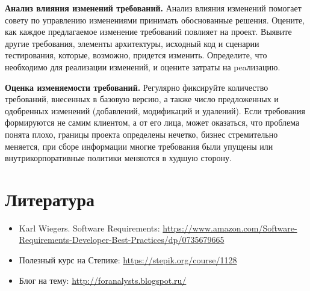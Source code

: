 \documentclass{../../text-style}
\begin{document}
\textbf{Анализ влияния изменений требований.}
 Анализ влияния изменений помогает совету по управлению изменениями принимать обоснованные решения.
 Оцените, как каждое предлагаемое изменение требований повлияет на проект.
 Выявите другие требования, элементы архитектуры, исходный код и сценарии тестирования, которые, возможно, придется изменить.
 Определите, что необходимо для реализации изменений, и оцените затраты на peaлизацию.

\textbf{Оценка изменяемости требований.}
Регулярно фиксируйте количество требований, внесенных в базовую версию, а также число предложенных и одобренных изменений (добавлений, модификаций и удалений).
Если требования формируются не самим клиентом, а от его лица, может оказаться, что проблема понята плохо, границы проекта определены нечетко, бизнес стремительно меняется, при сборе информации многие требования были упущены или внутрикорпоративные политики меняются в худшую сторону.

\section{Литература}

\begin{itemize}
    \item Karl Wiegers. Software Requirements: \url{https://www.amazon.com/Software-Requirements-Developer-Best-Practices/dp/0735679665}
    \item Полезный курс на Степике: \url{https://stepik.org/course/1128}
    \item Блог на тему: \url{http://foranalysts.blogspot.ru/}
\end{itemize}
\end{document}
